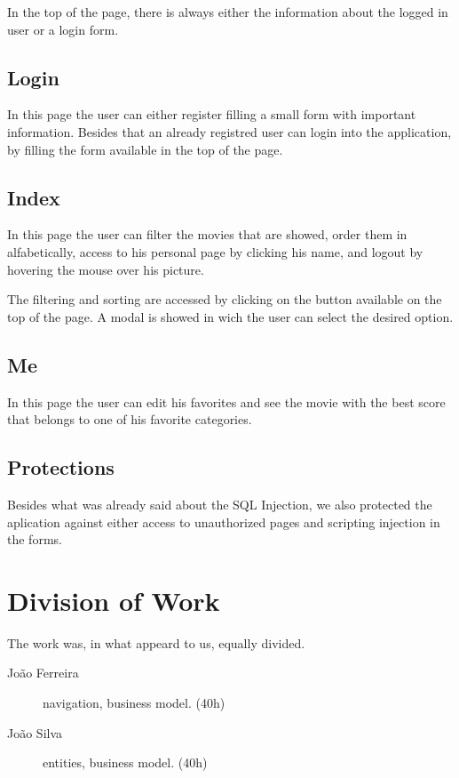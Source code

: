 \documentclass[12pt]{article}
\begin{document}
In the top of the page, there is always either the information about the logged in user or a login form.

\subsection{Login}
\indent \indent In this page the user can either register filling a small form with important information.
Besides that an already registred user can login into the application, by filling the form available in the top of the page.

\subsection{Index}
\indent \indent In this page the user can filter the movies that are showed, order them in alfabetically, access to his personal page by clicking his name, and logout by hovering the mouse over his picture.

The filtering and sorting are accessed by clicking on the button available on the top of the page. A modal is showed in wich the user can select the desired option.

\subsection{Me}
\indent \indent In this page the user can edit his favorites and see the movie with the best score that belongs to one of his favorite categories.

\subsection{Protections}
\indent \indent Besides what was already said about the SQL Injection, we also protected the aplication against either access to unauthorized pages and scripting injection in the forms.
\clearpage

\section{Division of Work}
\indent \indent The work was, in what appeard to us, equally divided.
\begin{description}
	\item [João Ferreira] navigation, business model. (40h)
	\item [João Silva] entities, business model. (40h)
\end{description}
\clearpage
\end{document}
